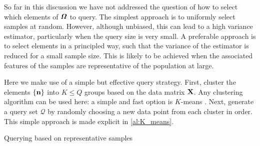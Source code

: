 \label{sec:query_strats}

So far in this discussion we have not addressed the question of how to select which elements of $\bm{\mathit{\Omega}}$ to query. The simplest approach is to uniformly select samples at random. However, although unbiased, this can lead to a high variance estimator, particularly when the query size is very small. A preferable approach is to select elements in a principled way, such that the variance of the estimator is reduced for a small sample size. This is likely to be achieved when the associated features of the samples are representative of the population at large. 

Here we make use of a simple but effective query strategy. First, cluster the elements $\{ \mathbf{n} \}$ into $K \leq Q$ groups based on the data matrix $\mathbf{X}$. Any clustering algorithm can be used here: a simple and fast option is $K$-means \citep{MacQueen1967, Hartigan1979}. Next, generate a query set $\mathcal{Q}$ by randomly choosing a new data point from each cluster in order. This simple approach is made explicit in \cref{al:K_means}. 

\vspace{0.5cm}

\begin{algorithm}[h]
\begin{algorithmic}
\vspace{0.05cm}
\vspace{0.05cm}
\vspace{0.05cm}
\vspace{0.15cm}
\vspace{0.15cm}
\vspace{0.15cm}
\vspace{0.15cm}
\vspace{0.15cm}
\vspace{0.15cm}
\vspace{0.15cm}
\vspace{0.15cm}
\EndFor
\vspace{0.15cm}
\vspace{0.15cm}
\end{algorithmic}
\caption{Querying based on representative samples}
\label{al:K_means}
\end{algorithm}


